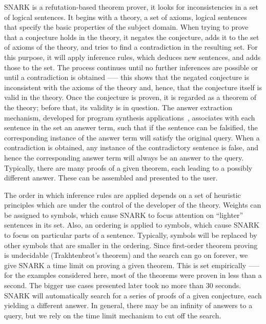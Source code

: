 SNARK is a refutation-based theorem prover, \ie it looks for inconsistencies in a set of logical sentences. It begins with a theory, a set of axioms, \ie logical sentences that specify the basic properties of the subject domain. 
When trying to prove that a conjecture holds in the theory, it negates the conjecture, adds it to the set of axioms of the theory, and tries to find a contradiction in the resulting set. 
For this purpose, it will apply inference rules, which deduces new sentences, and adds those to the set. The process continues until no further inferences are possible or until a contradiction is obtained \-—-- this shows that the negated conjecture is inconsistent with the axioms of the theory and, hence, that the conjecture itself is valid in the theory. 
Once the conjecture is proven, it is regarded as a theorem of the theory; before that, its validity is in question.
The answer extraction mechanism, developed for program synthesis applications~\cite{Manna:1980:DAP:357084.357090}, associates with each sentence in the set an answer term, such that if the sentence can be falsified, the corresponding instance of the answer term will satisfy the original query. 
When a contradiction is obtained, any instance of the contradictory sentence is false, and hence the corresponding answer term will always  be an answer to the query. 
Typically, there are many proofs of a given theorem, each leading to a possibly different answer. 
These can be assembled and presented to the user.

The order in which inference rules are applied depends on a set of heuristic principles which are under the control of the developer of the theory. 
Weights can be assigned to symbols, which cause SNARK to focus attention on “lighter” sentences in its set. 
Also, an ordering is applied to symbols, which cause SNARK to focus on particular parts of a sentence. 
Typically, symbols will be replaced by other symbols that are smaller in the ordering. 
Since first-order theorem proving is undecidable (Trakhtenbrot's theorem)  and the search can go on forever, we give SNARK a time limit on proving a given theorem. 
This is set empirically \-—-- for the examples considered here, most of the theorems were proven in less than a second. The bigger use cases presented later took no more than 30 seconds.
SNARK will automatically search for a series of proofs of a given conjecture, each yielding a different answer.
In general, there may be an infinity of answers to a query, but we rely on the time limit mechanism to cut off the search.

